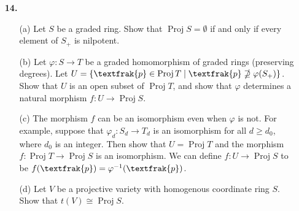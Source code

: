 \documentclass{article}
\newcommand{\goth}[1]{\textfrak{#1}}
\DeclareMathOperator{\proj}{Proj}
\DeclareMathOperator{\spec}{Spec}
\begin{document}
\begin{enumerate} [label=\textbf{\arabic*.}, leftmargin=0em]
\begin{proof}
\begin{itemize} [leftmargin=0cm]
        \item[(b)] Let $\{ U_i \}_{i \in I}$ be an open cover of $\spec{A}$. We can assume $U_i$ to be basic open sets of the form $D(f_i)$ for some $f_i \in A$. If $\spec{A} = \bigcup D(f_i)$, then $V((f_i)_{i \in I}) = \emptyset$, which implies the ideal generated by $f_i$ is the entire ring $A$. That means there exists a finite number of elements $f_1, \dots f_n$ such that $\sum_{i = 1}^n a_i f_i = 1$ for some $a_i \in A$, hence $D(f_1), \dots, D(f_n)$ is a finite subcover of $\spec{A}$.

        \item[(c)] The descending chain of irreducible closed subsets in $\text{sp}(\spec{A})$ corresponds to an ascending chain of prime ideals in $A$. If $A$ is noetherian any ascending chain of ideals must terminate, hence the corresponding descending chain of irreducible closed subsets must terminate.

        \item[(d)] Let $A = \prod_{i = 1}^\infty k$, where $k$ is any field. The prime ideals of $A$ are of the form $\goth{p}_i = \cdots \times k \times 0 \times k \cdots$, so $\spec{A}$ has countably infinite number of points, and closed subsets of $\spec{A}$ are finite set of points. Hence, $\spec{A}$ is a noetherian topological space. However, $A$ itself is not noetherian, e.g. $0 \times 0 \times \cdots \subset k \times 0 \times 0 \times \cdots \subset k \times k \times 0 \times \cdots \subset \cdots$.
    \end{itemize}
\end{proof}

\item[\textbf{14.}]
\begin{itemize}
    \item[(a)] Let $S$ be a graded ring. Show that $\proj{S} = \emptyset$ if and only if every element of $S_+$ is nilpotent.
    \item[(b)] Let $\varphi : S \to T$ be a graded homomorphism of graded rings (preserving degrees). Let $U = \{ \goth{p} \in \proj{T} \mid \goth{p} \nsupseteq \varphi(S_+) \}$. Show that $U$ is an open subset of $\proj{T}$, and show that $\varphi$ determines a natural morphism $f : U \to \proj{S}$.
    \item[(c)] The morphism $f$ can be an isomorphism even when $\varphi$ is not. For example, suppose that $\varphi_d : S_d \to T_d$ is an isomorphism for all $d \geq d_0$, where $d_0$ is an integer. Then show that $U = \proj{T}$ and the morphism $f : \proj{T} \to \proj{S}$ is an isomorphism. We can define $f : U \to \proj{S}$ to be $f(\goth{p}) = \varphi^{-1}(\goth{p})$.
    \item[(d)] Let $V$ be a projective variety with homogenous coordinate ring $S$. Show that $t(V) \cong \proj{S}$.
\end{itemize}


\end{enumerate}
\end{document}
